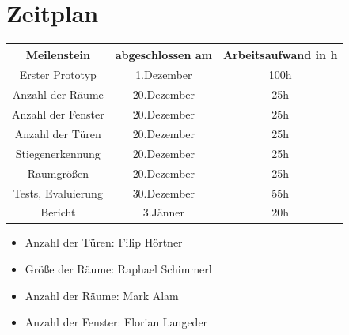 \documentclass[deutsch]{scrartcl}
\begin{document}
\section{Zeitplan}
\begin{table}[h!]
	\centering
		\begin{tabular}{|c|c|c|}
		\hline
		Meilenstein & abgeschlossen am & Arbeitsaufwand in h\\
		\hline
		Erster Prototyp & 1.Dezember & 100h\\
		Anzahl der Räume & 20.Dezember & 25h\\
		Anzahl der Fenster & 20.Dezember & 25h\\
		Anzahl der Türen & 20.Dezember & 25h\\
		Stiegenerkennung & 20.Dezember & 25h\\
		Raumgrößen & 20.Dezember & 25h\\
		Tests, Evaluierung & 30.Dezember & 55h\\
		Bericht & 3.Jänner & 20h\\
		\hline
		\end{tabular}
\end{table}
\begin{itemize}
	\item Anzahl der Türen: Filip Hörtner \cite{TUW-274401}
	\item Größe der Räume: Raphael Schimmerl \cite{jang18}
	\item Anzahl der Räume: Mark Alam \cite{vargas18}
	\item Anzahl der Fenster: Florian Langeder \cite{or2005highly}

	
\end{itemize}
\end{document}
